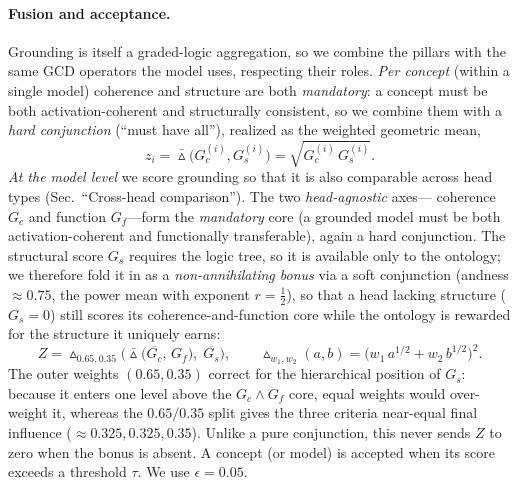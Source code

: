 \paragraph{Fusion and acceptance.}
Grounding is itself a graded-logic aggregation, so we combine the pillars with the
same GCD operators the model uses, respecting their roles. \emph{Per concept}
(within a single model) coherence and structure are both \emph{mandatory}: a concept
must be both activation-coherent and structurally consistent, so we combine them
with a \emph{hard conjunction} (``must have all''), realized as the weighted
geometric mean,
\begin{equation}
z_i=\bar\vartriangle\!\big(G_c^{(i)},G_s^{(i)}\big)=\sqrt{G_c^{(i)}\,G_s^{(i)}}.
\end{equation}
\emph{At the model level} we score grounding so that it is also comparable across
head types (Sec.~``Cross-head comparison''). The two \emph{head-agnostic} axes---%
coherence $G_c$ and function $G_f$---form the \emph{mandatory} core (a grounded model
must be both activation-coherent and functionally transferable), again a hard
conjunction. The structural score $G_s$ requires the logic tree, so it is available
only to the ontology; we therefore fold it in as a \emph{non-annihilating bonus}
via a soft conjunction (andness $\approx0.75$, the power mean with exponent
$r{=}\tfrac12$), so that a head lacking structure ($G_s{=}0$) still scores its
coherence-and-function core while the ontology is rewarded for the structure it
uniquely earns:
\begin{equation}
Z=\vartriangle_{\!0.65,0.35}\!\Big(\bar\vartriangle\big(\overline{G_c},\,G_f\big),\;\overline{G_s}\Big),
\qquad
\vartriangle_{\!w_1,w_2}(a,b)=\big(w_1\,a^{1/2}+w_2\,b^{1/2}\big)^{2}.
\end{equation}
The outer weights $(0.65,0.35)$ correct for the hierarchical position of $G_s$:
because it enters one level above the $G_c\wedge G_f$ core, equal weights would
over-weight it, whereas the $0.65/0.35$ split gives the three criteria near-equal
final influence ($\approx0.325,0.325,0.35$). Unlike a pure conjunction, this never
sends $Z$ to zero when the bonus is absent. A concept (or model) is accepted when
its score exceeds a threshold $\tau$. We use $\epsilon=0.05$.

